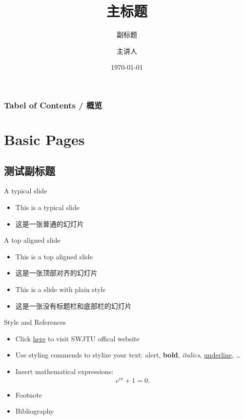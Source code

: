 \documentclass{beamer}
\title{主标题}
\subtitle{副标题}
\author{主讲人}
\institute{单位}
\date{\today}
\begin{document}
\begin{frame}[plain]
    \titlepage
\end{frame}


{
\begin{frame}
    \frametitle{Tabel of Contents / 概览}
    \tableofcontents
\end{frame}
}


\section{Basic Pages}
\subsection{测试副标题}


\begin{frame}{A typical slide}
    \begin{itemize}
        \item This is a typical slide
        \item 这是一张普通的幻灯片
    \end{itemize}
\end{frame}

\begin{frame}[t]{A top aligned slide}
    \vspace{20pt}
    \begin{itemize}
        \item This is a top aligned slide
        \item 这是一张顶部对齐的幻灯片
    \end{itemize}
\end{frame}

\begin{frame}[plain]
    \begin{itemize}
        \item This is a slide with plain style
        \item 这是一张没有标题栏和底部栏的幻灯片
    \end{itemize}
\end{frame}

\begin{frame}{Style and References}
    \begin{itemize}
        \item Click \textcolor{href}{\href{https://www.swjtu.edu.cn/}{here}} to visit SWJTU offical website
        \item Use styling commends to stylize your text: \alert{alert}, \textbf{bold}, \textit{italics}, \underline{underline}, \dots
        \item Insert mathematical expressions:
        \begin{equation*}
            e^{i\pi} + 1 = 0.
        \end{equation*}
        \item Footnote\footnotemark
        \item Bibliography \cite{knuth}
    \end{itemize}
\end{frame}
\end{document}
